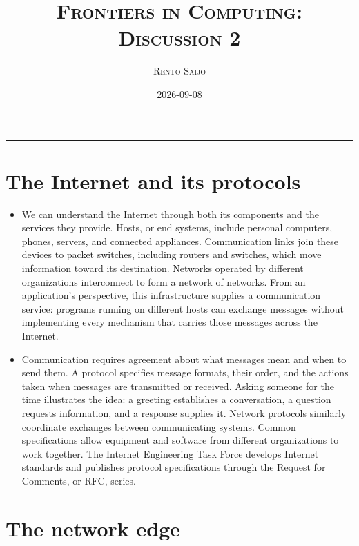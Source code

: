 \documentclass[10pt]{article}
\title{\Large\textsc{Frontiers in Computing: Discussion 2}}
\author{\large\textsc{Rento Saijo}}
\date{2026-09-08}
\begin{document}
\maketitle
\thispagestyle{fancy}
\vspace{-1em}\rule{\linewidth}{0.6pt}\vspace{0.5em}

\section*{The Internet and its protocols}

\begin{itemize}[leftmargin=1.25em, itemsep=0.3em, parsep=0pt, topsep=0pt]
    \item We can understand the Internet through both its components and the services they provide. Hosts, or end systems, include personal computers, phones, servers, and connected appliances. Communication links join these devices to packet switches, including routers and switches, which move information toward its destination. Networks operated by different organizations interconnect to form a network of networks. From an application's perspective, this infrastructure supplies a communication service: programs running on different hosts can exchange messages without implementing every mechanism that carries those messages across the Internet.

    \item Communication requires agreement about what messages mean and when to send them. A protocol specifies message formats, their order, and the actions taken when messages are transmitted or received. Asking someone for the time illustrates the idea: a greeting establishes a conversation, a question requests information, and a response supplies it. Network protocols similarly coordinate exchanges between communicating systems. Common specifications allow equipment and software from different organizations to work together. The Internet Engineering Task Force develops Internet standards and publishes protocol specifications through the Request for Comments, or RFC, series.
\end{itemize}

\section*{The network edge}
\end{document}
